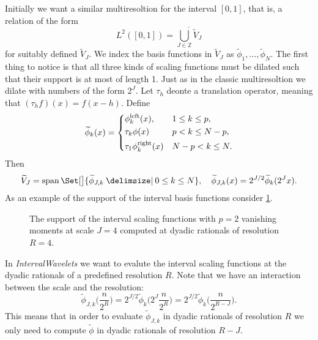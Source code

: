 \documentclass[a4paper]{scrartcl}
\newcommand\lphi{\ensuremath{\phi^{\text{left}}}}
\newcommand\rphi{\ensuremath{\phi^{\text{right}}}}
\newcommand\Z{\ensuremath{\mathbb{Z}}}
\DeclareMathOperator\spn{span}
\newcommand\given{\:\vert\:}
\newcommand\SetSymbol[1][]{
	\nonscript\: #1 \vert \nonscript\:
	\mathopen{} %
	\allowbreak %
}
\renewcommand\given{\SetSymbol[\delimsize]}
\begin{document}
Initially we want a similar multiresoltion for the interval $[0, 1]$, that is, a relation of the form
\begin{equation*}
    L^2([0, 1]) = \overline{\bigcup_{J\in\Z} \widetilde V_J}
\end{equation*}
for suitably defined $\widetilde V_J$.
We index the basis functions in $\widetilde V_J$ as $\widetilde \phi_1, \ldots, \widetilde \phi_N$.
The first thing to notice is that all three kinds of scaling functions must be dilated such that their support is at most of length 1.
Just as in the classic multiresoltion we dilate with numbers of the form $2^J$.
Let $\tau_h$ deonte a translation operator, meaning that $(\tau_h f)(x) = f(x - h)$.
Define
\begin{equation*}
    \widetilde \phi_k(x) = 
    \begin{dcases}
        \lphi_k(x), & 1\leq k\leq p, 
        \\
        \tau_k \phi(x) & p < k \leq N - p,
        \\
        \tau_1 \rphi_k(x) & N - p < k \leq N.
    \end{dcases}
\end{equation*}
Then 
\begin{equation*}
    \widetilde V_J = \spn\Set[\big]{\widetilde \phi_{J,k} \given 0\leq k\leq N},
    \quad
    \widetilde \phi_{J,k}(x) = 2^{J/2} \widetilde \phi_k(2^J x).
\end{equation*}
As an example of the support of the interval basis functions consider \cref{fig:support}.

\begin{figure}
    \centering
    \caption{The support of the interval scaling functions with $p = 2$ vanishing moments at scale $J = 4$ computed at dyadic rationals of resolution $R = 4$.}
    \label{fig:support}
\end{figure}

In \emph{IntervalWavelets} we want to evalute the interval scaling functions at the dyadic rationals of a predefined resolution $R$.
Note that we have an interaction between the scale and the resolution:
\begin{equation*}
    \widetilde\phi_{J,k}\biggl(\frac n{2^R}\biggr)
    = 2^{J/2} \widetilde \phi_k\biggl(2^J \frac n{2^R}\biggr)
    = 2^{J/2} \widetilde \phi_k\biggl(\frac n{2^{R - J}}\biggr).
\end{equation*}
This means that in order to evaluate $\widetilde\phi_{J,k}$ in dyadic rationals of resolution $R$ we only need to compute $\widetilde\phi$ in dyadic rationals of resolution $R - J$.

\printbibliography
\end{document}
